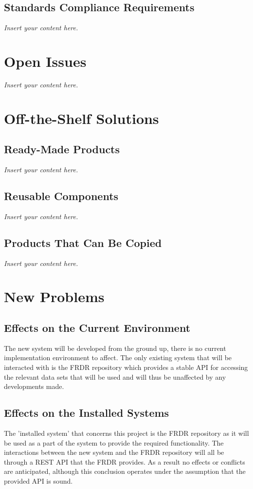 \documentclass[12pt]{article}
\newcommand{\lips}{\textit{Insert your content here.}}
\begin{document}
\subsection{Standards Compliance Requirements}
\lips

\section{Open Issues}
\lips

\section{Off-the-Shelf Solutions}
\subsection{Ready-Made Products}
\lips
\subsection{Reusable Components}
\lips
\subsection{Products That Can Be Copied}
\lips

\section{New Problems}
\subsection{Effects on the Current Environment}

The new system will be developed from the ground up, there is no current implementation environment to affect. The only existing system that will be interacted with is the FRDR repository which provides
a stable API for accessing the relevant data sets that will be used and will thus be unaffected by any developments made.

\subsection{Effects on the Installed Systems}

\par{ The 'installed system' that concerns this project is the FRDR repository as it will be used as a part of the system to provide the required functionality. The interactions between the new system and
the FRDR repository will all be through a REST API that the FRDR provides. As a result no effects or conflicts are anticipated, although this conclusion operates under the assumption that the provided
API is sound. }
\end{document}
